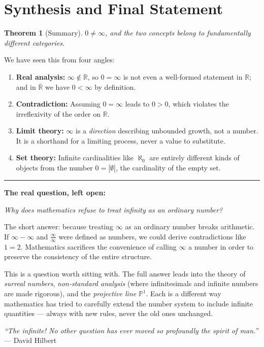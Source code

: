 \documentclass[12pt, a4paper]{article}
\newtheorem{theorem}{Theorem}
\theoremstyle{definition}
\theoremstyle{remark}
\begin{document}
\section{Synthesis and Final Statement}

\begin{theorem}[Summary]
$0 \neq \infty$, and the two concepts belong to fundamentally different categories.
\end{theorem}

We have seen this from four angles:

\begin{enumerate}
    \item \textbf{Real analysis:} $\infty \notin \mathbb{R}$, so $0 = \infty$ is not even a well-formed statement in $\mathbb{R}$; and in $\overline{\mathbb{R}}$ we have $0 < \infty$ by definition.

    \item \textbf{Contradiction:} Assuming $0 = \infty$ leads to $0 > 0$, which violates the irreflexivity of the order on $\mathbb{R}$.

    \item \textbf{Limit theory:} $\infty$ is a \emph{direction} describing unbounded growth, not a number. It is a shorthand for a limiting process, never a value to substitute.

    \item \textbf{Set theory:} Infinite cardinalities like $\aleph_0$ are entirely different kinds of objects from the number $0 = |\emptyset|$, the cardinality of the empty set.
\end{enumerate}

\vspace{0.5cm}
\hrule
\vspace{0.8cm}

\noindent\textbf{The real question, left open:}

\begin{center}
\itshape Why does mathematics refuse to treat infinity as an ordinary number?
\end{center}

The short answer: because treating $\infty$ as an ordinary number breaks arithmetic. If $\infty - \infty$ and $\frac{\infty}{\infty}$ were defined as numbers, we could derive contradictions like $1 = 2$. Mathematics sacrifices the convenience of calling $\infty$ a number in order to preserve the consistency of the entire structure.

This is a question worth sitting with. The full answer leads into the theory of \emph{surreal numbers}, \emph{non-standard analysis} (where infinitesimals and infinite numbers are made rigorous), and the \emph{projective line} $\mathbb{P}^1$. Each is a different way mathematics has tried to carefully extend the number system to include infinite quantities — always with new rules, never the old ones unchanged.

\vspace{1cm}
\begin{center}
\textit{``The infinite! No other question has ever moved so profoundly the spirit of man.''} \\
--- David Hilbert
\end{center}
\end{document}
